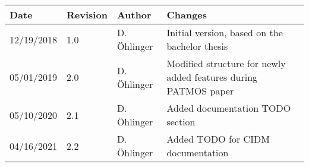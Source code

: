 \begin{center}
\begin{tabularx}{\linewidth}{ |l|l|l|X| } 
 \hline
 Date & Revision & Author & Changes \\ 
 \hline
 12/19/2018 & 1.0 & D. \"Ohlinger & Initial version, based on the bachelor 
 thesis \cite{Oeh18:Bthesis} \\ 
 \hline
 05/01/2019 & 2.0 & D. \"Ohlinger & Modified structure for newly added features 
 during PATMOS paper  \\ 
 \hline
 05/10/2020 & 2.1 & D. \"Ohlinger & Added documentation TODO section  \\ 
 \hline
  04/16/2021 & 2.2 & D. \"Ohlinger & Added TODO for CIDM documentation  \\ 
 \hline
\end{tabularx}
\end{center}